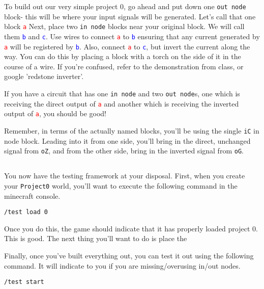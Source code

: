 \documentclass{article}
\begin{document}
To build out our very simple project 0, go ahead and put down one \texttt{out node} block- this will be where your input signals will be generated. Let's call that one block \textcolor{red}{\texttt{a}} Next, place two \texttt{in node} blocks near your original block. We will call them \textcolor{blue}{\texttt{b}} and \textcolor{blue}{\texttt{c}}. Use wires to connect \textcolor{red}{\texttt{a}} to \textcolor{blue}{\texttt{b}} ensuring that any current generated by \textcolor{red}{\texttt{a}} will be registered by \textcolor{blue}{\texttt{b}}. Also, connect \textcolor{red}{\texttt{a}} to \textcolor{blue}{\texttt{c}}, but invert the current along the way. You can do this by placing a block with a torch on the side of it in the course of a wire. If you're confused, refer to the demonstration from class, or google 'redstone inverter'. 

If you have a circuit that has one \texttt{in node} and two \texttt{out node}s, one which is receiving the direct output of \textcolor{red}{\texttt{a}} and another which is receiving the inverted output of \textcolor{red}{\texttt{a}}, you should be good!

Remember, in terms of the actually named blocks, you'll be using the single \texttt{iC} in node block. Leading into it from one side, you'll bring in the direct, unchanged signal from \texttt{oZ}, and from the other side, bring in the inverted signal from \texttt{oG}. 

\subsection{\selectfont{Testing Framework}}

You now have the testing framework at your disposal. First, when you create your \texttt{Project0} world, you'll want to execute the following command in the minecraft console.

\begin{tcolorbox}
  \texttt{/test load 0}
\end{tcolorbox}

Once you do this, the game should indicate that it has properly loaded project 0. This is good. The next thing you'll want to do is place the 

Finally, once you've built everything out, you can test it out using the following command. It will indicate to you if you are missing/overusing in/out nodes.

\begin{tcolorbox}
  \texttt{/test start}
\end{tcolorbox}
\end{document}
